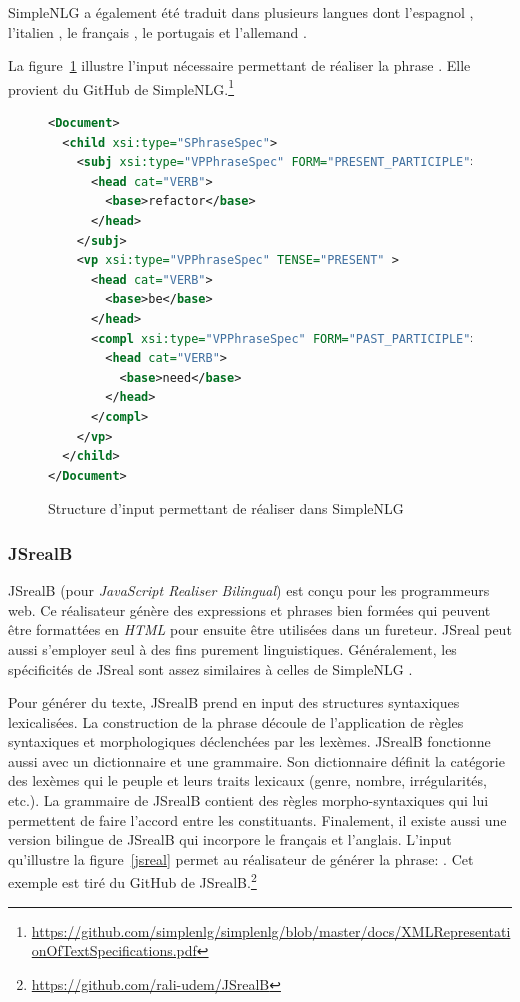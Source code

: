 SimpleNLG a également été traduit dans plusieurs langues dont l'espagnol \citep{RamosSotoAdaptingSimpleNLGSpanish2017}, l'italien \citep{MazzeiSimpleNLGITadaptingSimpleNLG2016}, le français \citep{VaudryAdaptingSimpleNLGBilingual2013}, le portugais \citep{deOliveiraAdaptingSimpleNLGBrazilian2014} et l'allemand \citep{BollmannAdaptingSimpleNLGGerman2011}.

La figure~\ref{simplenlg} illustre l'input nécessaire permettant de réaliser la phrase . Elle provient du GitHub de SimpleNLG.\footnote{\url{https://github.com/simplenlg/simplenlg/blob/master/docs/XMLRepresentationOfTextSpecifications.pdf}}

\begin{figure}[htb]
 \caption{Structure d'input permettant de réaliser  dans SimpleNLG}
 \label{simplenlg}
\begin{lstlisting}[language=Xml]
<Document>
  <child xsi:type="SPhraseSpec">
    <subj xsi:type="VPPhraseSpec" FORM="PRESENT_PARTICIPLE">
      <head cat="VERB">
        <base>refactor</base>
      </head>
    </subj>
    <vp xsi:type="VPPhraseSpec" TENSE="PRESENT" >
      <head cat="VERB">
        <base>be</base>
      </head>
      <compl xsi:type="VPPhraseSpec" FORM="PAST_PARTICIPLE">
        <head cat="VERB">
          <base>need</base>
        </head>
      </compl>
    </vp>
  </child>
</Document>
\end{lstlisting}
\end{figure}

\subsubsection{JSrealB}
JSrealB (pour \emph{JavaScript Realiser Bilingual}) \citep{DBLP:conf/enlg/MolinsL15} est conçu pour les programmeurs web. Ce réalisateur génère des expressions et phrases bien formées qui peuvent être formattées en \emph{HTML} pour ensuite être utilisées dans un fureteur. JSreal peut aussi s'employer seul à des fins purement linguistiques. Généralement, les spécificités de JSreal sont assez similaires à celles de SimpleNLG \citep{GattSimpleNLGRealisationEngine2009}.

Pour générer du texte, JSrealB prend en input des structures syntaxiques lexicalisées. La construction de la phrase découle de l'application de règles syntaxiques et morphologiques déclenchées par les lexèmes. JSrealB fonctionne aussi avec un dictionnaire et une grammaire. Son dictionnaire définit la catégorie des lexèmes qui le peuple et leurs traits lexicaux (genre, nombre, irrégularités, etc.). La grammaire de JSrealB contient des règles morpho-syntaxiques qui lui permettent de faire l'accord entre les constituants. Finalement, il existe aussi une version bilingue de JSrealB \citep{MolinsJSrealBBilingualText2015} qui incorpore le français et l'anglais. L'input qu'illustre la figure~\ref{jsreal} permet au réalisateur de générer la phrase: . Cet exemple est tiré du GitHub de JSrealB.\footnote{\url{https://github.com/rali-udem/JSrealB}}

